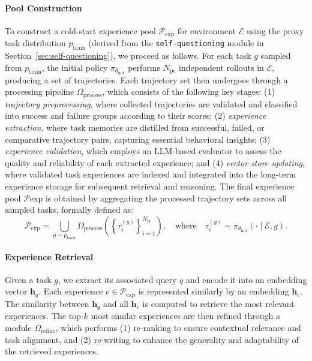 \paragraph{Pool Construction}


To construct a cold-start experience pool $\mathcal{P}_{\text{exp}}$ for environment $\mathcal{E}$ using the proxy task distribution $p_{\text{train}}$ (derived from the \texttt{self-questioning} module in Section~\ref{sec:self-questioning}), we proceed as follows. For each task $g$ sampled from $p_{\text{train}}$, the initial policy $\pi_{\theta_{\text{init}}}$ performs $N_{\text{pc}}$ independent rollouts in $\mathcal{E}$, producing a set of trajectories. Each trajectory set then undergoes through a processing pipeline $\Omega_{\text{process}}$, which consists of the following key stages:
(1) \emph{trajectory preprocessing}, where collected trajectories are validated and classified into success and failure groups according to their scores;
(2) \emph{experience extraction}, where task memories are distilled from successful, failed, or comparative trajectory pairs, capturing essential behavioral insights;
(3) \emph{experience validation}, which employs an LLM-based evaluator to assess the quality and reliability of each extracted experience; and
(4) \emph{vector store updating}, where validated task experiences are indexed and integrated into the long-term experience storage for subsequent retrieval and reasoning.
The final experience pool $\mathcal{P}{\text{exp}}$ is obtained by aggregating the processed trajectory sets across all sampled tasks, formally defined as:
\begin{equation}
\mathcal{P}_{\text{exp}} = \bigcup_{g \sim p_{\text{train}}} \Omega_{\text{process}} \left( \left\{ \tau_i^{(g)} \right\}_{i=1}^{N_{\text{pc}}} \right), \quad \text{where} \quad \tau_i^{(g)} \sim \pi_{\theta_{\text{init}}}(\cdot \mid \mathcal{E}, g).
\end{equation}


\paragraph{Experience Retrieval}
Given a task $g$, we extract its associated query $q$ and encode it into an embedding vector $\mathbf{h}_q$. Each experience $e \in \mathcal{P}_{\text{exp}}$ is represented similarly by an embedding $\mathbf{h}_e$. The similarity between $\mathbf{h}_q$ and all $\mathbf{h}_e$ is computed to retrieve the most relevant experiences. The top-$k$ most similar experiences are then refined through a module $\Omega_{\text{refine}}$, which performs (1) re-ranking to ensure contextual relevance and task alignment, and (2) re-writing to enhance the generality and adaptability of the retrieved experiences.


